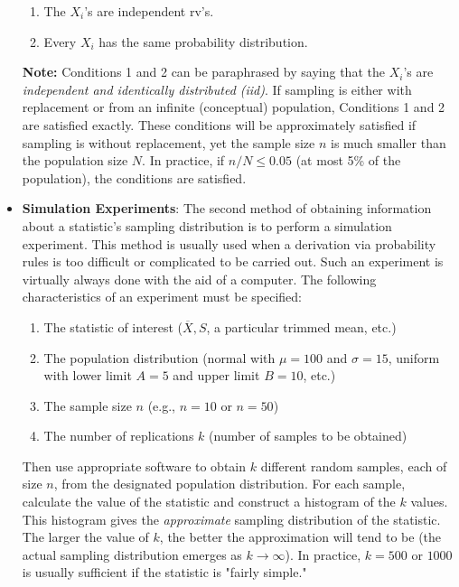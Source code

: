 \documentclass{report}
\begin{document}
\begin{itemize}
            \begin{enumerate}
                \item The \( X_i \)'s are independent rv's.
                \item Every \( X_i \) has the same probability distribution.
            \end{enumerate}
            \bigbreak \noindent 
            \textbf{Note:} Conditions 1 and 2 can be paraphrased by saying that the \(X_i\)'s are \textit{independent and identically distributed (iid)}. If sampling is either with replacement or from an infinite (conceptual) population, Conditions 1 and 2 are satisfied exactly. These conditions will be approximately satisfied if sampling is without replacement, yet the sample size \(n\) is much smaller than the population size \(N\). In practice, if \(n/N \leq 0.05\) (at most 5\% of the population), the conditions are satisfied.
        \item \textbf{Simulation Experiments}:
            The second method of obtaining information about a statistic’s sampling distribution
            is to perform a simulation experiment. This method is usually used when a derivation via probability rules is too difficult or complicated to be carried out. Such an
            experiment is virtually always done with the aid of a computer. The following characteristics of an experiment must be specified:
            \bigbreak \noindent 
            \begin{enumerate}
                \item The statistic of interest (\(\overline{X}, S\), a particular trimmed mean, etc.)
                \item The population distribution (normal with \(\mu = 100\) and \(\sigma = 15\), uniform with lower limit \(A = 5\) and upper limit \(B = 10\), etc.)
                \item The sample size \(n\) (e.g., \(n = 10\) or \(n = 50\))
                \item The number of replications \(k\) (number of samples to be obtained)
            \end{enumerate}
            \bigbreak \noindent Then use appropriate software to obtain \( k \) different random samples, each of size \( n \), from the designated population distribution. For each sample, calculate the value of the statistic and construct a histogram of the \( k \) values. This histogram gives the \textit{approximate} sampling distribution of the statistic. The larger the value of \( k \), the better the approximation will tend to be (the actual sampling distribution emerges as \( k \to \infty \)). In practice, \( k = 500 \) or \( 1000 \) is usually sufficient if the statistic is "fairly simple."

\end{itemize}
\end{document}
